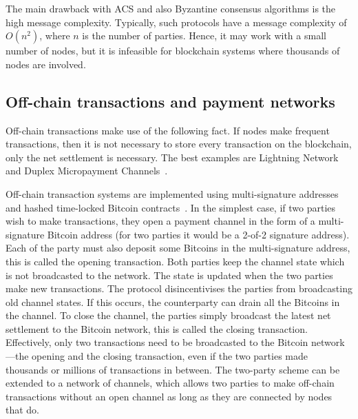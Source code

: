 The main drawback with ACS and also Byzantine consensus algorithms is the high message complexity.
Typically, such protocols have a message complexity of $O(n^2)$, where $n$ is the number of parties.
Hence, it may work with a small number of nodes,
but it is infeasible for blockchain systems where thousands of nodes are involved.




\subsection{Off-chain transactions and payment networks}
Off-chain transactions make use of the following fact.
If nodes make frequent transactions,
then it is not necessary to store every transaction on the blockchain,
only the net settlement is necessary.
The best examples are Lightning Network~\cite{lightningnetwork} and Duplex Micropayment Channels~\cite{decker2015fast}.

Off-chain transaction systems are implemented using multi-signature addresses~\cite{bitcoinmultisig} and hashed time-locked Bitcoin contracts~\cite{bitcointimelock}.
In the simplest case, 
if two parties wish to make transactions,
they open a payment channel in the form of a multi-signature Bitcoin address (for two parties it would be a 2-of-2 signature address).
Each of the party must also deposit some Bitcoins in the multi-signature address,
this is called the opening transaction.
Both parties keep the channel state which is not broadcasted to the network.
The state is updated when the two parties make new transactions.
The protocol disincentivises the parties from broadcasting old channel states.
If this occurs, the counterparty can drain all the Bitcoins in the channel.
To close the channel, the parties simply broadcast the latest net settlement to the Bitcoin network,
this is called the closing transaction.
Effectively, only two transactions need to be broadcasted to the Bitcoin network---the opening and the closing transaction,
even if the two parties made thousands or millions of transactions in between.
The two-party scheme can be extended to a network of channels,
which allows two parties to make off-chain transactions without an open channel as long as they are connected by nodes that do.

